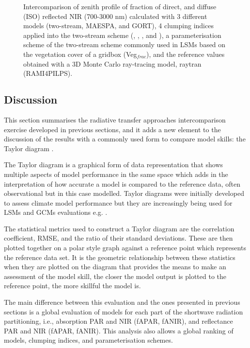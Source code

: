 \begin{figure}
\begin{tabular}{lll}
\end{tabular}
\caption{Intercomparison of zenith profile of fraction of direct, and diffuse (ISO) reflected NIR (700-3000 nm) calculated with 3 different models (two-stream, MAESPA, and GORT), 4 clumping indices applied into the two-stream scheme (\citet{Nilson1971}, \citet{Kucharik1999}, \citet{pinty2006}, and \citet{Ni-Meister2010}), a parameterisation scheme of the two-stream scheme commonly used in LSMs based on the vegetation cover of a gridbox (Veg$_{frac}$), and the reference values obtained with a 3D Monte Carlo ray-tracing model, raytran (RAMI4PILPS).}
\label{f:szacomparisonalbNIR}
\end{figure}

\subsection{Discussion}

This section summarises the radiative transfer approaches intercomparison exercise developed in previous sections, and it adds a new element to the discussion of the results with a commonly used form to compare model skills: the Taylor diagram \citep{Taylor2001}.

The Taylor diagram is a graphical form of data representation that shows multiple aspects of model performance in the same space which adds in the interpretation of how accurate a model is compared to the reference data, often observational but in this case modelled. Taylor diagrams were initially developed to assess climate model performance but they are increasingly being used for LSMs and GCMs evaluations e.g. \citet{poulter2011,Stockli2011,Anav2015}.

The statistical metrics used to construct a Taylor diagram are the correlation coefficient, RMSE, and the ratio of their standard deviations. These are then plotted together on a polar style graph against a reference point which represents the reference data set. It is the geometric relationship between these statistics when they are plotted on the diagram that provides the means to make an assessment of the model skill, the closer the model output is plotted to the reference point, the more skillful the model is.

The main difference between this evaluation and the ones presented in previous sections is a global evaluation of models for each part of the shortwave radiation partitioning, i.e., absorption PAR and NIR (fAPAR, fANIR), and reflectance PAR and NIR (fAPAR, fANIR). This analysis also allows a global ranking of models, clumping indices, and parameterisation schemes.


